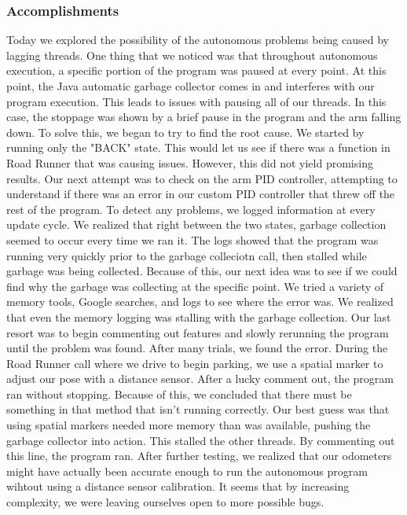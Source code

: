\subsubsection*{Accomplishments}
Today we explored the possibility of the autonomous problems being caused by lagging threads. One thing that we noticed was that throughout autonomous execution, a specific portion of the program was paused at every point. At this point, the Java automatic garbage collector comes in and interferes with our program execution. This leads to issues with pausing all of our threads. In this case, the stoppage was shown by a brief pause in the program and the arm falling down. 
To solve this, we began to try to find the root cause. We started by running only the "BACK" state. This would let us see if there was a function in Road Runner that was causing issues. However, this did not yield promising results. Our next attempt was to check on the arm PID controller, attempting to understand if there was an error in our custom PID controller that threw off the rest of the program. To detect any problems, we logged information at every update cycle. We realized that right between the two states, garbage collection seemed to occur every time we ran it. The logs showed that the program was running very quickly prior to the garbage colleciotn call, then stalled while garbage was being collected. Because of this, our next idea was to see if we could find why the garbage was collecting at the specific point. We tried a variety of memory tools, Google searches, and logs to see where the error was. We realized that even the memory logging was stalling with the garbage collection.
Our last resort was to begin commenting out features and slowly rerunning the program until the problem was found. After many trials, we found the error. During the Road Runner call where we drive to begin parking, we use a spatial marker to adjust our pose with a distance sensor. After a lucky comment out, the program ran without stopping. Because of this, we concluded that there must be something in that method that isn't running correctly. Our best guess was that using spatial markers needed more memory than was available, pushing the garbage collector into action. This stalled the other threads. By commenting out this line, the program ran. After further testing, we realized that our odometers might have actually been accurate enough to run the autonomous program wihtout using a distance sensor calibration. It seems that by increasing complexity, we were leaving ourselves open to more possible bugs. 

